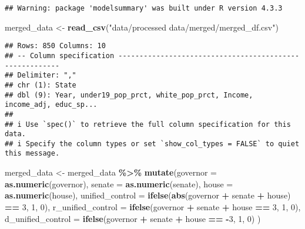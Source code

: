 \documentclass[
]{article}
\newenvironment{Shaded}{\begin{snugshade}}{\end{snugshade}}
\newcommand{\AttributeTok}[1]{\textcolor[rgb]{0.13,0.29,0.53}{#1}}
\newcommand{\DecValTok}[1]{\textcolor[rgb]{0.00,0.00,0.81}{#1}}
\newcommand{\FunctionTok}[1]{\textcolor[rgb]{0.13,0.29,0.53}{\textbf{#1}}}
\newcommand{\NormalTok}[1]{#1}
\newcommand{\OtherTok}[1]{\textcolor[rgb]{0.56,0.35,0.01}{#1}}
\newcommand{\SpecialCharTok}[1]{\textcolor[rgb]{0.81,0.36,0.00}{\textbf{#1}}}
\newcommand{\StringTok}[1]{\textcolor[rgb]{0.31,0.60,0.02}{#1}}
\begin{document}
\begin{verbatim}
## Warning: package 'modelsummary' was built under R version 4.3.3
\end{verbatim}

\begin{Shaded}
\begin{Highlighting}[]
\NormalTok{merged\_data }\OtherTok{\textless{}{-}} \FunctionTok{read\_csv}\NormalTok{(}\StringTok{"data/processed data/merged/merged\_df.csv"}\NormalTok{)}
\end{Highlighting}
\end{Shaded}

\begin{verbatim}
## Rows: 850 Columns: 10
## -- Column specification --------------------------------------------------------
## Delimiter: ","
## chr (1): State
## dbl (9): Year, under19_pop_prct, white_pop_prct, Income, income_adj, educ_sp...
## 
## i Use `spec()` to retrieve the full column specification for this data.
## i Specify the column types or set `show_col_types = FALSE` to quiet this message.
\end{verbatim}

\begin{Shaded}
\begin{Highlighting}[]
\NormalTok{merged\_data }\OtherTok{\textless{}{-}}\NormalTok{ merged\_data }\SpecialCharTok{\%\textgreater{}\%}
  \FunctionTok{mutate}\NormalTok{(}\AttributeTok{governor =} \FunctionTok{as.numeric}\NormalTok{(governor),}
         \AttributeTok{senate =} \FunctionTok{as.numeric}\NormalTok{(senate),}
         \AttributeTok{house =} \FunctionTok{as.numeric}\NormalTok{(house),}
         \AttributeTok{unified\_control =} \FunctionTok{ifelse}\NormalTok{(}\FunctionTok{abs}\NormalTok{(governor }\SpecialCharTok{+}\NormalTok{ senate }\SpecialCharTok{+}\NormalTok{ house) }\SpecialCharTok{==} \DecValTok{3}\NormalTok{, }\DecValTok{1}\NormalTok{, }\DecValTok{0}\NormalTok{),}
         \AttributeTok{r\_unified\_control =} \FunctionTok{ifelse}\NormalTok{(governor }\SpecialCharTok{+}\NormalTok{ senate }\SpecialCharTok{+}\NormalTok{ house }\SpecialCharTok{==} \DecValTok{3}\NormalTok{, }\DecValTok{1}\NormalTok{, }\DecValTok{0}\NormalTok{),}
         \AttributeTok{d\_unified\_control =} \FunctionTok{ifelse}\NormalTok{(governor }\SpecialCharTok{+}\NormalTok{ senate }\SpecialCharTok{+}\NormalTok{ house }\SpecialCharTok{==} \SpecialCharTok{{-}}\DecValTok{3}\NormalTok{, }\DecValTok{1}\NormalTok{, }\DecValTok{0}\NormalTok{)}
\NormalTok{  )}
\end{Highlighting}
\end{Shaded}
\end{document}
